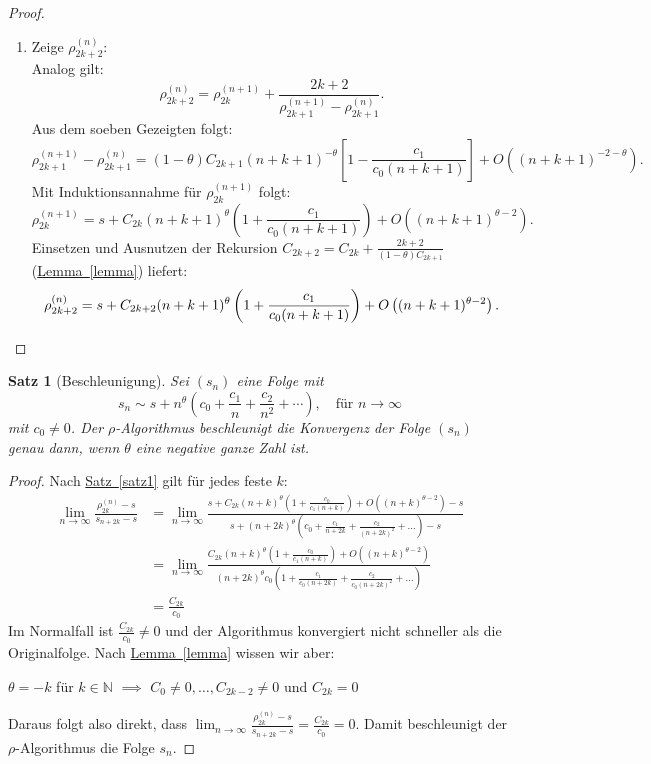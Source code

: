 \documentclass[a4paper,12pt]{article}
\numberwithin{equation}{section}
\newcommand{\lemref}[1]{\hyperref[#1]{Lemma~\ref*{#1}}}
\newcommand{\sref}[1]{\hyperref[#1]{Satz~\ref*{#1}}}
\newtheorem{satz}{Satz}[section]
\theoremstyle{remark}
\begin{document}
\begin{proof}
\begin{enumerate}
\item {Zeige \(\rho_{2k+2}^{(n)}\):} \\
Analog gilt:
\[
\rho_{2k+2}^{(n)} = \rho_{2k}^{(n+1)} + \frac{2k + 2}{\rho_{2k+1}^{(n+1)} - \rho_{2k+1}^{(n)}}.
\]
Aus dem soeben Gezeigten folgt:
\[
\rho_{2k+1}^{(n+1)} - \rho_{2k+1}^{(n)} = (1 - \theta) C_{2k+1} (n + k + 1)^{-\theta} \left[ 1 - \frac{c_1}{c_0 (n + k + 1)} \right] + O\left( (n + k + 1)^{-2 - \theta} \right).
\]
Mit Induktionsannahme für \(\rho_{2k}^{(n+1)}\) folgt:
\[
\rho_{2k}^{(n+1)} = s + C_{2k} (n + k + 1)^{\theta} \left( 1 + \frac{c_1}{c_0 (n + k + 1)} \right) + O\left( (n + k + 1)^{\theta - 2} \right).
\]
Einsetzen und Ausnutzen der Rekursion \(C_{2k+2} = C_{2k} + \frac{2k + 2}{(1 - \theta) C_{2k+1}}\) (\lemref{lemma}) liefert:
\[
\rho_{2k+2}^{(n)} = s + C_{2k+2} (n + k + 1)^{\theta} \left( 1 + \frac{c_1}{c_0 (n + k + 1)} \right) + O\left( (n + k + 1)^{\theta - 2} \right). \qedhere
\]
\end{enumerate}

\end{proof}





\begin{satz}[Beschleunigung]\label{satz2}
\textit{Sei $(s_n)$ eine Folge mit
\[
s_n \sim s + n^{\theta}(c_0 + \frac{c_1}{n} + \frac{c_2}{n^2} + \cdots), \quad \text{für } n \to \infty
\]
mit $c_0 \ne 0$.
Der $\rho$-Algorithmus beschleunigt die Konvergenz der Folge $(s_n)$ genau dann, wenn $\theta$ eine negative ganze Zahl ist.}
\end{satz}

\begin{proof}
Nach \sref{satz1} gilt für jedes feste $k$:
\begin{align*}
\lim_{n \to \infty} \frac{\rho_{2k}^{(n)} - s}{s_{n+2k} - s} &= \lim_{n \to \infty}\frac{s+C_{2k}(n+k)^{\theta}(1+\frac{c_0}{c_1(n+k)})+O((n+k)^{\theta-2})-s}{s+(n+2k)^\theta(c_0+\frac{c_1}{n+2k}+\frac{c_2}{(n+2k)^2}+\dots)-s}\\
&=\lim_{n \to \infty}\frac{C_{2k}(n+k)^{\theta}(1+\frac{c_0}{c_1(n+k)})+O((n+k)^{\theta-2})}{(n+2k)^\theta c_0(1+\frac{c_1}{c_0(n+2k)}+\frac{c_2}{c_0(n+2k)^2}+\dots)}\\
&=\frac{C_{2k}}{c_0} 
\end{align*}
Im Normalfall ist $\frac{C_{2k}}{c_0}\neq0$ und der Algorithmus konvergiert nicht schneller als die Originalfolge. Nach \lemref{lemma} wissen wir aber:

\begin{center}
$\theta = -k$ für $k \in \mathbb{N}$ $\implies$ $C_0\ne0,\dots,C_{2k-2}\ne0$ und $C_{2k} = 0$
\end{center}
Daraus folgt also direkt, dass $\lim_{n \to \infty} \frac{\rho_{2k}^{(n)} - s}{s_{n+2k} - s}=\frac{C_{2k}}{c_0}=0$. Damit beschleunigt der $\rho$-Algorithmus die Folge $s_n$.

\end{proof}
\end{document}
